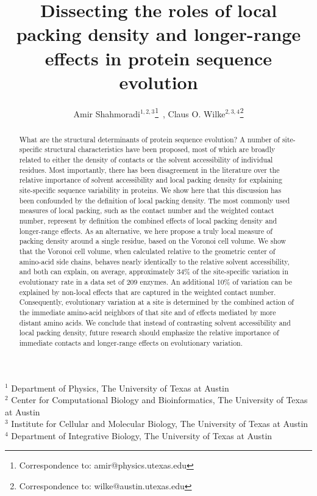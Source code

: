 \documentclass[12pt]{article}
\begin{document}
\title{Dissecting the roles of local packing density and longer-range effects in protein sequence evolution}

\author{Amir Shahmoradi$^{1,2,3}$\footnote{Correspondence to: amir@physics.utexas.edu}~, Claus O. Wilke$^{2,3,4}$\footnote{Correspondence to: wilke@austin.utexas.edu}}
\date{}
\maketitle

\noindent
$^1$ Department of Physics, The University of Texas at Austin\\
$^2$ Center for Computational Biology and Bioinformatics, The University of Texas at Austin\\ 
$^3$ Institute for Cellular and Molecular Biology, The University of Texas at Austin\\
$^4$ Department of Integrative Biology, The University of Texas at Austin\\


\begin{abstract}
What are the structural determinants of protein sequence evolution? A number of site-specific structural characteristics have been proposed, most of which are broadly related to either the density of contacts or the solvent accessibility of individual residues. Most importantly, there has been disagreement in the literature over the relative importance of solvent accessibility and local packing density for explaining site-specific sequence variability in proteins. We show here that this discussion has been confounded by the definition of local packing density. The most commonly used measures of local packing, such as the contact number and the weighted contact number, represent by definition the combined effects of local packing density and longer-range effects. As an alternative, we here propose a truly local measure of packing density around a single residue, based on the Voronoi cell volume. We show that the Voronoi cell volume, when calculated relative to the geometric center of amino-acid side chains, behaves nearly identically to the relative solvent accessibility, and both can explain, on average, approximately 34\% of the site-specific variation in evolutionary rate in a data set of 209 enzymes. An additional 10\% of variation can be explained by non-local effects that are captured in the weighted contact number. Consequently, evolutionary variation at a site is determined by the combined action of the immediate amino-acid neighbors of that site and of effects mediated by more distant amino acids. We conclude that instead of contrasting solvent accessibility and local packing density, future research should emphasize the relative importance of immediate contacts and longer-range effects on evolutionary variation.
\end{abstract}
\end{document}
